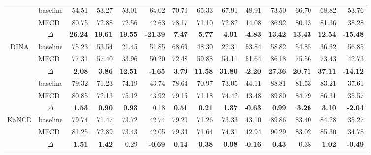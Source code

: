 \documentclass[a4paper,runningheads]{llncs}
\def\mymethod{MFCD}
\newcommand{\redbf}[1]{\textcolor{myred}{\textbf{#1}}} %
\newcommand{\green}[1]{\textcolor{mygreen}{#1}}       %
\begin{document}
\begin{table}[!t]
{\begin{tabular}{cc|rrrr|rrrr|rrrr}
\rowcolor{mybgc}& baseline & 54.51 & 53.27 & 53.01 & 64.02 & 70.70 & 65.33 & 67.91 & 48.91 & 73.50 & 66.70 & 68.82 & 53.76 \\
\rowcolor{mybgc} & \mymethod\ & 80.75 & 72.88 & 72.56 & 42.63 & 78.17 & 71.10 & 72.82 & 44.08 & 86.92 & 80.13 & 81.36 & 38.28 \\
\rowcolor{mybgc} \multirow{-3}{*}{MIRT} & $\Delta$ & \redbf{26.24} & \redbf{19.61} & \redbf{19.55} & \redbf{-21.39} & \redbf{7.47} & \redbf{5.77} & \redbf{4.91} & \redbf{-4.83} & \redbf{13.42} & \redbf{13.43} & \redbf{12.54} & \redbf{-15.48} \\

\multirow{3}{*}{DINA} & baseline & 75.23 & 53.54 & 21.45 & 51.85 & 68.69 & 48.30 & 22.31 & 53.84 & 58.82 & 54.85 & 36.32 & 56.85 \\
 & \mymethod\ & 77.31 & 57.40 & 33.96 & 50.20 & 72.48 & 59.88 & 54.11 & 51.64 & 86.18 & 75.56 & 73.43 & 42.73 \\
 & $\Delta$ & \redbf{2.08} & \redbf{3.86} & \redbf{12.51} & \redbf{-1.65} & \redbf{3.79} & \redbf{11.58} & \redbf{31.80} & \redbf{-2.20} & \redbf{27.36} & \redbf{20.71} & \redbf{37.11} & \redbf{-14.12} \\

\rowcolor{mybgc}& baseline & 79.32 & 71.23 & 74.19 & 43.74 & 78.64 & 70.97 & 73.05 & 44.11 & 88.81 & 81.53 & 83.21 & 37.61 \\
\rowcolor{mybgc} & \mymethod\ & 80.85 & 72.13 & 75.12 & 43.92 & 79.15 & 71.18 & 74.42 & 43.48 & 89.80 & 84.79 & 86.31 & 35.57 \\
\rowcolor{mybgc} \multirow{-3}{*}{NCDM} & $\Delta$ & \redbf{1.53} & \redbf{0.90} & \redbf{0.93} & \green{0.18} & \redbf{0.51} & \redbf{0.21} & \redbf{1.37} & \redbf{-0.63} & \redbf{0.99} & \redbf{3.26} & \redbf{3.10} & \redbf{-2.04}  \\

\multirow{3}{*}{KaNCD} & baseline & 79.74 & 71.47 & 73.72 & 42.74 & 79.20 & 71.26 & 73.33 & 43.10 & 89.86 & 83.40 & 84.28 & 35.27 \\
 & \mymethod\ & 81.25 & 72.89 & 73.43 & 42.05 & 79.34 & 71.64 & 74.31 & 42.94 & 90.29 & 83.02 & 85.30 & 34.78 \\
 & $\Delta$ & \redbf{1.51} & \redbf{1.42} & \green{-0.29} & \redbf{-0.69} & \redbf{0.14} & \redbf{0.38} & \redbf{0.98} & \redbf{-0.16} & \redbf{0.43} & \green{-0.38} & \redbf{1.02} & \redbf{-0.49}  \\


\end{tabular}}
\end{table}
\end{document}
